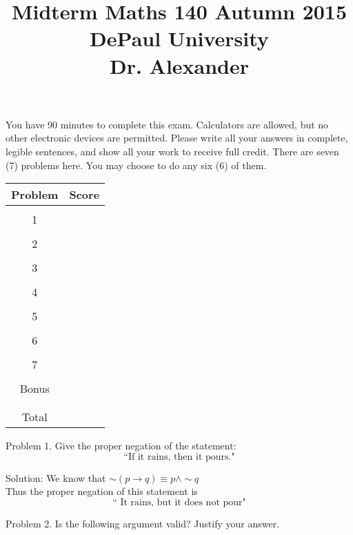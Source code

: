 \documentclass[16 pt]{amsart}
\theoremstyle{definition}
\theoremstyle{remark}
\numberwithin{equation}{subsection}
\begin{document}
\title{Midterm Maths 140 Autumn 2015 \\ DePaul University\\Dr. Alexander}
\maketitle
You have 90 minutes to complete this exam.  Calculators are allowed, but no other electronic devices are permitted.  Please write all your answers in complete, legible sentences, and show all your work to receive full credit.  There are seven (7) problems here.  You may choose to do any six (6) of them.  
\vspace{1in}


\begin{center}
  \begin{tabular}{ c | c }
    Problem & Score\\
    \hline
    &\\
    1&\\
    &\\
    2&\\
    &\\
    3&\\
    &\\
    4&\\
    &\\
    5&\\
    &\\
    6&\\
    &\\
    7&\\
    &\\
    Bonus&\\
    &\\
    \hline 
    &\\    
    Total& 
 \end{tabular}
\end{center}

\newpage 
Problem 1. Give the proper negation of the statement:
\[
\text{``If it rains, then it pours."}
\]


\vspace{1in}

Solution: We know that $\sim(p\rightarrow q) \equiv p \wedge \sim q$\\

Thus the proper negation of this statement is
\[
\text{`` It rains, but it does not pour"}
\]

\newpage
Problem 2. Is the following argument valid?  Justify your answer.\\
\end{document}
